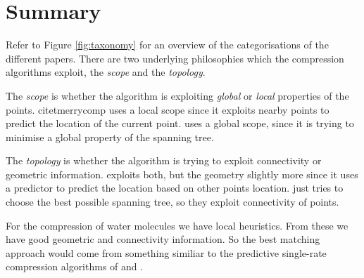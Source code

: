 \documentclass{report}
\begin{document}
\section{Summary}

Refer to Figure \ref{fig:taxonomy} for an overview of the categorisations of
the different papers. There are two underlying philosophies which the
compression algorithms exploit, the \emph{scope} and the \emph{topology}.

The \emph{scope} is whether the algorithm is exploiting \emph{global} or
\emph{local} properties of the points. citet{merrycomp} uses a local scope
since it exploits nearby points to predict the location of the current
point. \citet{chen2005lcp} uses a global scope, since it is trying to minimise
a global property of the spanning tree.

The \emph{topology} is whether the algorithm is trying to exploit connectivity
or geometric information. \citet{gumholdcomp} exploits both, but the geometry
slightly more since it uses a predictor to predict the location based on other
points location. \citet{chen2005lcp} just tries to choose the best possible
spanning tree, so they exploit connectivity of points.

For the compression of water molecules we have local heuristics. From these we
have good geometric and connectivity information. So the best matching
approach would come from something similiar to the predictive single-rate
compression algorithms of \citet{merrycomp} and \citet{gumholdcomp}.
\end{document}
